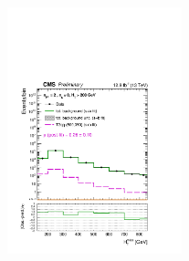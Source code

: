 \begin{figure}[tbhp]
\begin{center}
  \includegraphics[width=0.45\textwidth]{mhtShape_eq0b_le2j_200_Inf_fit_s_aux}
  \end{center}
\end{figure}


